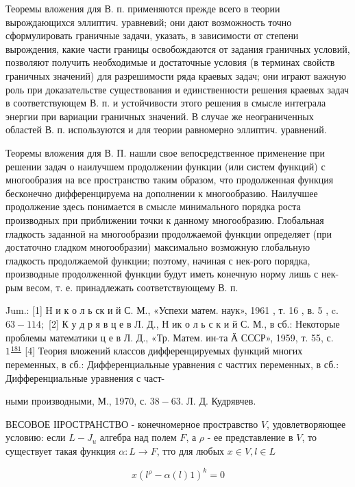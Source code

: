 \documentclass[10pt]{article}
\begin{document}
Теоремы вложения для В. п. применяются прежде всего в теории вырождающихся эллиптич. уравневий; они дают возможность точно сформулировать граничные задачи, указать, в зависимости от степени вырождения, какие части границы освобождаются от задания граничных условий, позволяют получить необходимые и достаточные условия (в терминах свойств граничных значений) для разрешимости ряда краевых задач; они играют важную роль при доказательстве существования и единственности решения краевых задач в соответствующем В. п. и устойчивости этого решения в смысле интеграла энергии при вариации граничных значений. В случае же неограниченных областей В. п. используются и для теории равномерно эллиптич. уравнений.



Теоремы вложения для В. П. нашли свое вепосредственное применение при решении задач о наилучшем продолжении функции (или систем функций) с многообразия на все пространство таким образом, что продолженная функция бесконечно дифференцируема на дополнении к многообразию. Наилучшее продолжение здесь понимается в смысле минимального порядка роста производных при приближении точки к данному многообразию. Глобальная гладкость заданной на многообразии продолжаемой функции определяет (при достаточно гладком многообразии) максимально возможную глобальную гладкость продолжаемой функции; поэтому, начиная с нек-рого порядка, производные продолженной функции будут иметь конечную норму лишь с нек-рым весом, т. е. принадлежать соответствующему В. п.



Jum.: [1] Н и к о л ь ск и й С. М., «Успехи матем. наук», 1961 , т. 16 , в. 5 , c. $63-114 ;$ [2] К у д р я в ц е в Л. Д., Н ик о л ь с к и й С. М., в сб.: Некоторые проблемы математики ц е в Л. Д., «Тр. Матем. ин-та Ӓ СССР», 1959, т. 55, с. $1 \frac{181}{}$ [4] Теория вложений классов дифференцируемых функций многих переменных, в сб.: Дифференциальные уравнения с частгих переменных, в сб.: Дифференциальные уравнения с част-

ными производными, М., 1970, с. $38-63$. Л. Д. Кудрявчев.



ВЕСОВОЕ ІІРОСТРАНСТВО - конечномерное простравство $V$, удовлетворяющее условию: если $L-J_{u}$ алгебра над полем $F$, а $\rho$ - ее представление в $V$, то существует такая функция $\alpha: L \rightarrow F$, тто для любых $x \in V, l \in L$



\[

x\left(l^{\rho}-\alpha(l) 1\right)^{k}=0

\]
\end{document}
